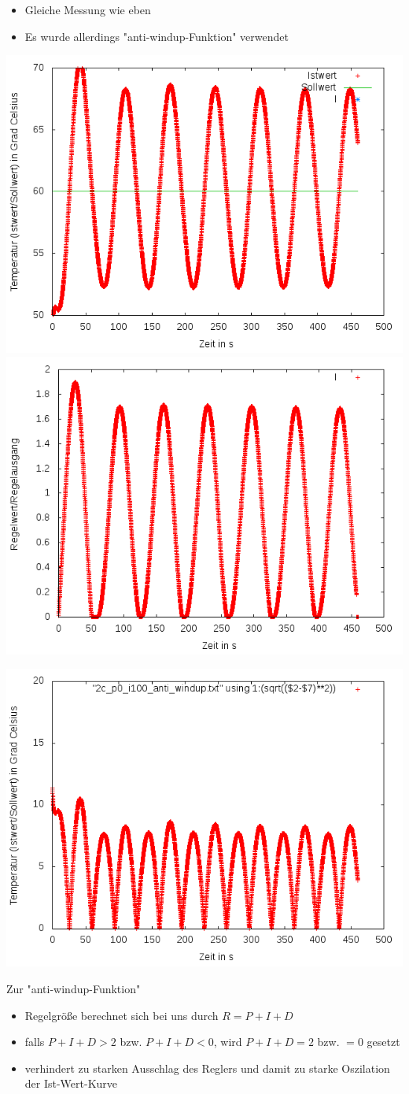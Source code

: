 \documentclass[compress,11pt]{beamer}
\begin{document}
\begin{frame}
\begin{itemize}
\item Gleiche Messung wie eben
\item Es wurde allerdings "anti-windup-Funktion" verwendet
\end{itemize}
\includegraphics[width=.5\textwidth]{../2aufgabe/2c2}
\includegraphics[width=.5\textwidth]{../2aufgabe/2c2_I}
\end{frame}
\begin{frame}
\includegraphics[width=.5\textwidth]{../2aufgabe/2c2_betrag}
\end{frame}
\begin{frame}
\begin{block}{Zur "anti-windup-Funktion"}
\begin{itemize}
\item Regelgröße berechnet sich bei uns durch $R = P + I + D$
\item falls $P + I + D > 2$ bzw. $P + I + D < 0$, wird $P + I + D = 2$ bzw. $= 0$ gesetzt
\item verhindert zu starken Ausschlag des Reglers und damit zu starke Oszilation der Ist-Wert-Kurve
\end{itemize}
\end{block}
\end{frame}
\end{document}
